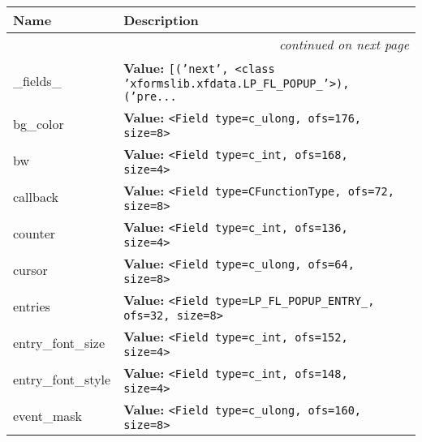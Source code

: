     \vspace{-1cm}
\hspace{\varindent}\begin{longtable}{|p{\varnamewidth}|p{\vardescrwidth}|l}
\cline{1-2}
\cline{1-2} \centering \textbf{Name} & \centering \textbf{Description}& \\
\cline{1-2}
\endhead\cline{1-2}\multicolumn{3}{r}{\small\textit{continued on next page}}\\\endfoot\cline{1-2}
\endlastfoot\raggedright \_\-f\-i\-e\-l\-d\-s\-\_\- & \raggedright \textbf{Value:} 
{\tt \texttt{[}\texttt{(}\texttt{'}\texttt{next}\texttt{'}\texttt{, }{\textless}class 'xformslib.xfdata.LP\_FL\_POPUP\_'{\textgreater}\texttt{)}\texttt{, }\texttt{(}\texttt{'}\texttt{pre}\texttt{...}}&\\
\cline{1-2}
\raggedright b\-g\-\_\-c\-o\-l\-o\-r\- & \raggedright \textbf{Value:} 
{\tt {\textless}Field type=c\_ulong, ofs=176, size=8{\textgreater}}&\\
\cline{1-2}
\raggedright b\-w\- & \raggedright \textbf{Value:} 
{\tt {\textless}Field type=c\_int, ofs=168, size=4{\textgreater}}&\\
\cline{1-2}
\raggedright c\-a\-l\-l\-b\-a\-c\-k\- & \raggedright \textbf{Value:} 
{\tt {\textless}Field type=CFunctionType, ofs=72, size=8{\textgreater}}&\\
\cline{1-2}
\raggedright c\-o\-u\-n\-t\-e\-r\- & \raggedright \textbf{Value:} 
{\tt {\textless}Field type=c\_int, ofs=136, size=4{\textgreater}}&\\
\cline{1-2}
\raggedright c\-u\-r\-s\-o\-r\- & \raggedright \textbf{Value:} 
{\tt {\textless}Field type=c\_ulong, ofs=64, size=8{\textgreater}}&\\
\cline{1-2}
\raggedright e\-n\-t\-r\-i\-e\-s\- & \raggedright \textbf{Value:} 
{\tt {\textless}Field type=LP\_FL\_POPUP\_ENTRY\_, ofs=32, size=8{\textgreater}}&\\
\cline{1-2}
\raggedright e\-n\-t\-r\-y\-\_\-f\-o\-n\-t\-\_\-s\-i\-z\-e\- & \raggedright \textbf{Value:} 
{\tt {\textless}Field type=c\_int, ofs=152, size=4{\textgreater}}&\\
\cline{1-2}
\raggedright e\-n\-t\-r\-y\-\_\-f\-o\-n\-t\-\_\-s\-t\-y\-l\-e\- & \raggedright \textbf{Value:} 
{\tt {\textless}Field type=c\_int, ofs=148, size=4{\textgreater}}&\\
\cline{1-2}
\raggedright e\-v\-e\-n\-t\-\_\-m\-a\-s\-k\- & \raggedright \textbf{Value:} 
{\tt {\textless}Field type=c\_ulong, ofs=160, size=8{\textgreater}}&\\
\cline{1-2}

\end{longtable}
